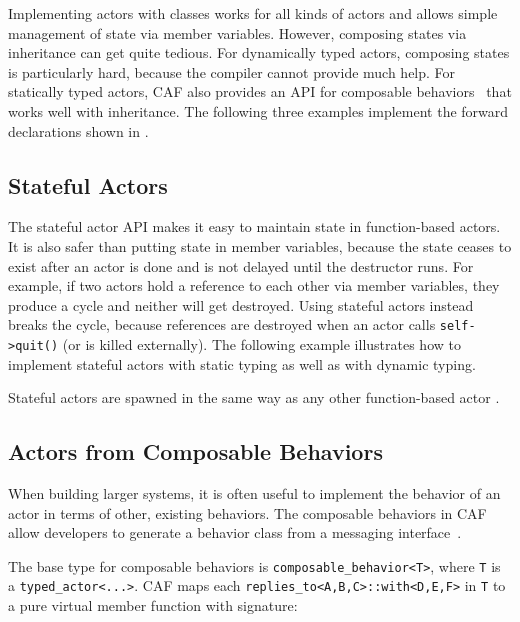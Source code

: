 Implementing actors with classes works for all kinds of actors and allows
simple management of state via member variables. However, composing states via
inheritance can get quite tedious. For dynamically typed actors, composing
states is particularly hard, because the compiler cannot provide much help. For
statically typed actors, CAF also provides an API for composable
behaviors~ that works well with inheritance. The
following three examples implement the forward declarations shown in
.


\clearpage
\subsection{Stateful Actors}
\label{stateful-actor}

The stateful actor API makes it easy to maintain state in function-based
actors. It is also safer than putting state in member variables, because the
state ceases to exist after an actor is done and is not delayed until the
destructor runs. For example, if two actors hold a reference to each other via
member variables, they produce a cycle and neither will get destroyed. Using
stateful actors instead breaks the cycle, because references are destroyed when
an actor calls \lstinline^self->quit()^ (or is killed externally). The
following example illustrates how to implement stateful actors with static
typing as well as with dynamic typing.


Stateful actors are spawned in the same way as any other function-based actor
.


\clearpage
\subsection{Actors from Composable Behaviors \experimental}
\label{composable-behavior}

When building larger systems, it is often useful to implement the behavior of
an actor in terms of other, existing behaviors. The composable behaviors in
CAF allow developers to generate a behavior class from a messaging
interface~.

The base type for composable behaviors is \lstinline^composable_behavior<T>^,
where \lstinline^T^ is a \lstinline^typed_actor<...>^. CAF maps each
\lstinline^replies_to<A,B,C>::with<D,E,F>^ in \lstinline^T^ to a pure virtual
member function with signature:

